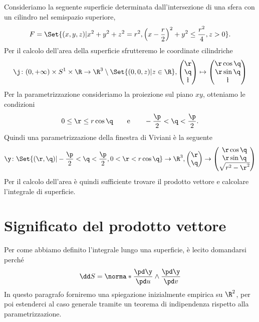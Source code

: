 \begin{ese}
	Consideriamo la seguente superficie determinata dall'intersezione di una sfera con un cilindro nel semispazio superiore,
	\[
		F = \Set{(x,y,z) | x^2+y^2+z^2 = r^2, \left( x- \frac{r}{2} \right)^2 + y^2 \le \frac{r^2}{4},z>0}.
	\]
	Per il calcolo dell'area della superficie sfrutteremo le coordinate cilindriche
	\[
		\j\colon (0,+\infty) \times S^1 \times \R \to \R^3\setminus\Set{(0,0,z) | z\in \R}, \begin{pmatrix}\r\\\q\\\l\end{pmatrix} \mapsto \begin{pmatrix}
			\r\cos\q \\
			\r\sin\q \\
			\l
		\end{pmatrix}
	\]
	Per la parametrizzazione consideriamo la proiezione sul piano \(x y\), otteniamo le condizioni
	\[
		0 \le \r \le r\cos \q \qquad\text{e}\qquad -\frac{\p}{2} < \q < \frac{\p}{2}.
	\]
	Quindi una parametrizzazione della finestra di Viviani è la seguente
	\[
		\y\colon \Set{(\r,\q) | -\frac{\p}{2}<\q<\frac{\p}{2}, 0<\r<r\cos\q} \to \R^3, \begin{pmatrix}\r\\\q\end{pmatrix} \to 	\begin{pmatrix}
			\r \cos \q \\
			\r \sin \q \\
			\sqrt{r^2-\r^2}
		\end{pmatrix}
	\]
	Per il calcolo dell'area è quindi sufficiente trovare il prodotto vettore e calcolare l'integrale di superficie.
\end{ese}
\section{Significato del prodotto vettore}

Per come abbiamo definito l'integrale lungo una superficie, è lecito domandarsi perché
\[
	\dd S = \norma*{\frac{\pd \y}{\pd u} \wedge \frac{\pd \y}{\pd v}}
\]
In questo paragrafo forniremo una spiegazione inizialmente empirica su \(\R^2\), per poi estenderci al caso generale tramite un teorema di indipendenza rispetto alla parametrizzazione.

